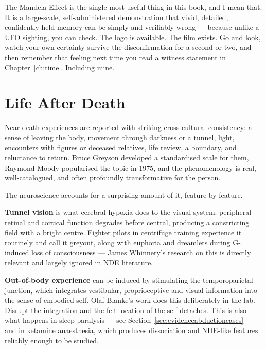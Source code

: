 \begin{funfact}
The Mandela Effect is the single most useful thing in this book, and I mean that. It is a
large-scale, self-administered demonstration that vivid, detailed, confidently held memory can be
simply and verifiably wrong --- because unlike a UFO sighting, you can check. The logo is
available. The film exists. Go and look, watch your own certainty survive the disconfirmation for
a second or two, and then remember that feeling next time you read a witness statement in
Chapter~\ref{ch:time}. Including mine.
\end{funfact}

\section{Life After Death}\label{sec:afterlife}

Near-death experiences are reported with striking cross-cultural consistency: a sense of leaving
the body, movement through darkness or a tunnel, light, encounters with figures or deceased
relatives, life review, a boundary, and reluctance to return. Bruce Greyson developed a
standardised scale for them, Raymond Moody popularised the topic in 1975, and the phenomenology
is real, well-catalogued, and often profoundly transformative for the person.

The neuroscience accounts for a surprising amount of it, feature by feature.

\textbf{Tunnel vision} is what cerebral hypoxia does to the visual system: peripheral retinal
and cortical function degrades before central, producing a constricting field with a bright
centre. Fighter pilots in centrifuge training experience it routinely and call it greyout,
along with euphoria and dreamlets during G-induced loss of consciousness --- James Whinnery's
research on this is directly relevant and largely ignored in NDE literature.

\textbf{Out-of-body experience} can be induced by stimulating the temporoparietal junction,
which integrates vestibular, proprioceptive and visual information into the sense of embodied
self. Olaf Blanke's work does this deliberately in the lab. Disrupt the integration and the
felt location of the self detaches. This is also what happens in sleep paralysis --- see
Section~\ref{sec:evidenceabductioncases} --- and in ketamine anaesthesia, which produces dissociation and NDE-like features
reliably enough to be studied.

